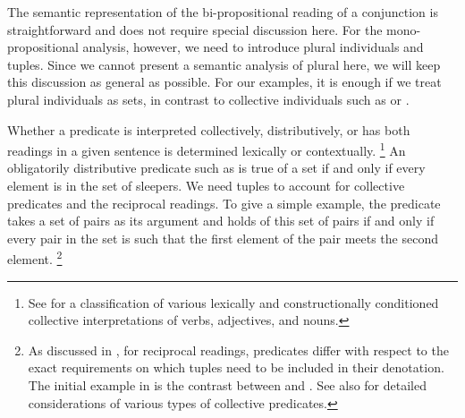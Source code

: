 \documentclass[output=paper]{langsci/langscibook}
\begin{document}
The semantic representation of the bi-propositional reading of a conjunction is straightforward and does not require special discussion here. 
For the mono-propositional analysis, however, we need to introduce plural individuals and tuples.
%
Since we cannot present a semantic analysis of plural here, we will keep this discussion as general as possible. 
For our examples, it is enough if we treat plural individuals as sets, in contrast to collective individuals such as  or  \citep{Link:83}. 

Whether a predicate is interpreted collectively, distributively, or has both readings in a given sentence is determined lexically or contextually.%
\footnote{See \citet[46]{Winter:01} for a classification of various lexically and constructionally conditioned collective interpretations of verbs, adjectives, and nouns.}
%
An  obligatorily distributive predicate such as  is true of a set if 
and only if every element is in the set of sleepers.
We need tuples to account for collective predicates and the reciprocal readings. 
To give a simple example, the predicate  takes a set of pairs as its argument and holds of this set of pairs if and only if every pair in the set is such that the first element of the pair meets the second element.%
\footnote{As discussed in \citet{Sabato:Winter:12}, for reciprocal readings, predicates differ with respect to the exact requirements on which tuples need to be included in their denotation. 
The initial example in \citet{Sabato:Winter:12} is the contrast between  and .
See also \citet{Winter:16} for detailed considerations of various types of collective predicates.
}




\end{document}
